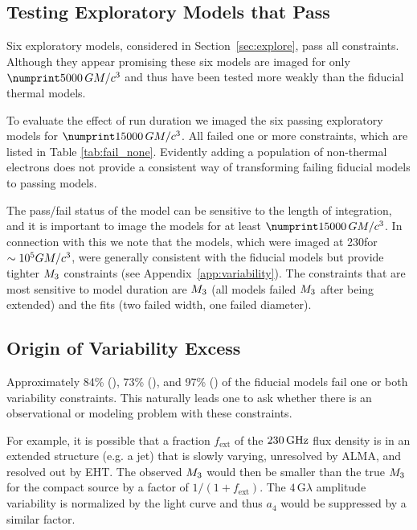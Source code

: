 \subsection{Testing Exploratory Models that Pass}

Six exploratory models, considered in Section~\ref{sec:explore},  pass all constraints.
Although they appear promising these six models are imaged for only $\no{5000}\,\tg$ and thus have been tested more weakly than the fiducial thermal models.

To evaluate the effect of run duration we imaged the six passing exploratory models for  $\no{15000}\,\tg$.
All failed one or more constraints, which are listed in Table \ref{tab:fail_none}.
Evidently adding a population of non-thermal electrons does not provide a consistent way of transforming failing fiducial models to passing models.

The pass/fail status of the model can be sensitive to the length of integration, and it is important to image the models for at least $\no{15000}\,\tg$.
In connection with this we note that the \koral models, which were imaged at 230\GHz for $\sim 10^5 GM/c^3$, were generally consistent with the fiducial models but provide tighter $M_{3}$ constraints (see Appendix~\ref{app:variability}).
The constraints that are most sensitive to model duration are $M_{3}$ (all models failed $M_{3}$ after being extended) and the \mring fits (two failed \mring width, one failed \mring diameter).

\subsection{Origin of Variability Excess}

Approximately 84\% (\kharma), 73\% (\bhac), and 97\% (\hamr) of the fiducial models fail one or both variability constraints.
This naturally leads one to ask whether there is an observational or modeling problem with these constraints.

For example, it is possible that a fraction $f_\mathrm{ext}$ of the $230\,\mathrm{GHz}$ flux density is in an extended structure (e.g. a jet) that is slowly varying, unresolved by ALMA, and resolved out by EHT.
The observed $M_{3}$ would then be smaller than the true $M_{3}$ for the compact source by a factor of $1/(1 + f_\mathrm{ext})$.
The $4\,\mathrm{G}\lambda$ amplitude variability is normalized by the light curve and thus $a_4$ would be suppressed by a similar factor.

